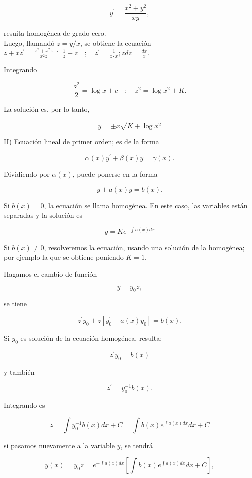 \documentclass[10pt]{article}
\theoremstyle{plain}
\theoremstyle{definition}
\theoremstyle{remark}
\begin{document}
$$
y^{\prime}=\frac{x^{2}+y^{2}}{x y},
$$

resuita homogénea de grado cero.\\
Luego, llamandó $z=y / x$, se obtiene la ecuación\\
$z+x z^{\prime}=\frac{x^{2}+x^{2} z}{x^{2} z} \doteq \frac{1}{z}+z \quad ; \quad z^{\prime}=\frac{1}{z \cdot x} ; z d z=\frac{d x}{x}$.

Integrando

$$
\frac{z^{2}}{2}=\log x+c \quad ; \quad z^{2}=\log x^{2}+K .
$$

La solución es, por lo tanto,

$$
y= \pm x \sqrt{K+\log x^{2}}
$$

II) Ecuación lineal de primer orden; es de la forma

$$
\alpha(x) y^{\prime}+\beta(x) y=\gamma(x) .
$$

Dividiendo por $\alpha(x)$, puede ponerse en la forma


\begin{equation*}
y+a(x) y=b(x) . \tag{4-2}
\end{equation*}


Si $b(x)=0$, la ecuación se llama homogénea. En este caso, las variables están separadas y la solución es

$$
y=K e^{-\int a(x) d x}
$$


Si $b(x) \neq 0$, resolveremos la ecuación, usando una solución de la homogénea; por ejemplo la que se obtiene poniendo $K=1$.

Hagamos el cambio de función

$$
y=y_{0} z,
$$

se tiene

$$
z^{\prime} y_{0}+z\left[y_{0}^{\prime}+a(x) y_{0}\right]=b(x) .
$$

Si $y_{0}$ es solución de la ecuación homogénea, resulta:

$$
z^{\prime} y_{0}=b(x)
$$

y también

$$
z^{\prime}=y_{0}^{-1} b(x) .
$$

Integrando es

$$
z=\int y_{0}^{-1} b(x) d x+C=\int b(x) e^{\int a(x) d x} d x+C
$$

si pasamos nuevamente a la variable $y$, se tendrá


\begin{equation*}
y(x)=y_{0} z=e^{-\int a(x) d x}\left[\int b(x) e^{\int a(x) d x} d x+C\right], \tag{4-3}
\end{equation*}
\end{document}

